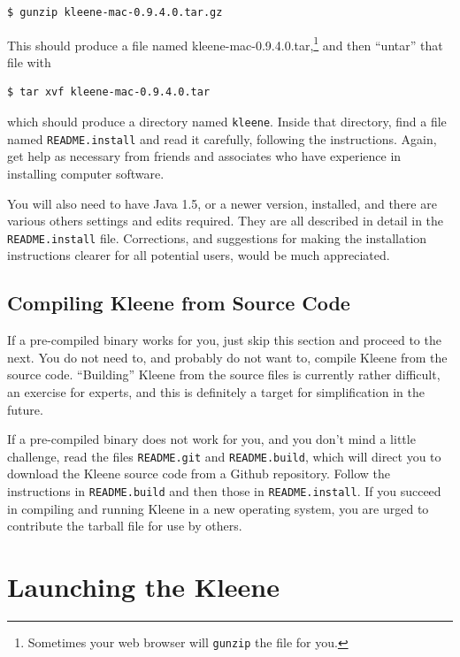 \begin{Verbatim}
$ gunzip kleene-mac-0.9.4.0.tar.gz
\end{Verbatim}

\noindent
This should produce a file named kleene-mac-0.9.4.0.tar,\footnote{Sometimes 
your web browser will \texttt{gunzip} the file for you.} and then ``untar'' that file with

\begin{Verbatim}
$ tar xvf kleene-mac-0.9.4.0.tar
\end{Verbatim}

\noindent
which should produce a directory named \texttt{kleene}.  Inside that directory, 
find a file named \texttt{README.install} and read it carefully, following the 
instructions.  Again, get help as necessary from friends and associates who have 
experience in installing computer
software.

You will also need to have Java 1.5, or a newer version, installed, and
there are various others settings and edits required.  They are all
described in detail in the \texttt{README.install} file.
Corrections, and suggestions for making the installation instructions clearer for all
potential users, would be much appreciated.

\subsection{Compiling Kleene from Source Code}

If a pre-compiled binary works for you, just skip this section and proceed to the next.
You do not need to, and probably do not want to, compile Kleene from the
source code.  ``Building'' Kleene from the source files is currently
rather difficult, an exercise for experts, and this is definitely a target
for simplification in the future.

If a pre-compiled binary does not work for you, and you don't mind a little
challenge, read the files \texttt{README.git} and \texttt{README.build},
which will direct you to download the Kleene source code from a Github
repository.  Follow the instructions in \texttt{README.build} and then
those in \texttt{README.install}.  If you succeed in compiling and running
Kleene in a new operating system, you are urged to contribute the
tarball file for use by others.

\section{Launching the Kleene }

